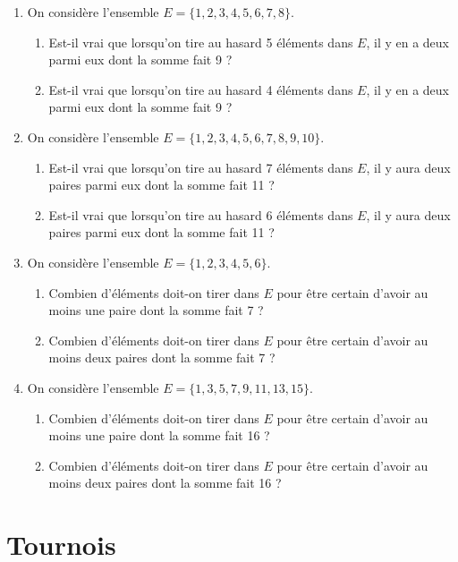 \documentclass[a4paper,11pt]{article}
\begin{document}
\begin{enumerate}
\item On considère l'ensemble $E = \{1, 2, 3, 4, 5, 6, 7, 8\}$.
\begin{enumerate}
\item Est-il vrai que lorsqu'on tire au hasard 5 éléments dans $E$, il y en a deux parmi eux dont la somme fait 9 ?
\item Est-il vrai que lorsqu'on tire au hasard 4 éléments dans $E$, il y en a deux parmi eux dont la somme fait 9 ?
\end{enumerate}

\item On considère l'ensemble $E = \{1, 2, 3, 4, 5, 6, 7, 8, 9, 10\}$.
\begin{enumerate}
\item Est-il vrai que lorsqu'on tire au hasard 7 éléments dans $E$, il y aura deux paires parmi eux dont la somme fait 11 ?
\item Est-il vrai que lorsqu'on tire au hasard 6 éléments dans $E$, il y aura deux paires parmi eux dont la somme fait 11 ?
\end{enumerate}

\item On considère l'ensemble $E = \{1, 2, 3, 4, 5, 6\}$.
\begin{enumerate}
\item Combien d'éléments doit-on tirer dans $E$ pour être certain d'avoir au moins une paire dont la somme fait 7 ?
\item Combien d'éléments doit-on tirer dans $E$ pour être certain d'avoir au moins deux paires dont la somme fait 7 ?
\end{enumerate}

\item On considère l'ensemble $E = \{1, 3, 5, 7, 9, 11, 13, 15\}$.
\begin{enumerate}
\item Combien d'éléments doit-on tirer dans $E$ pour être certain d'avoir au moins une paire dont la somme fait 16 ?
\item Combien d'éléments doit-on tirer dans $E$ pour être certain d'avoir au moins deux paires dont la somme fait 16 ?
\end{enumerate}
\end{enumerate}

\section{Tournois}
\end{document}
